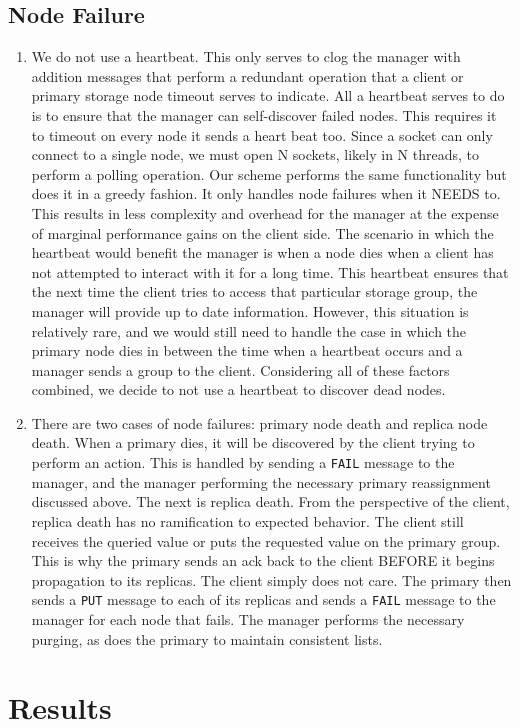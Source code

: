 \documentclass{article}
\begin{document}
\subsection{Node Failure}
\begin{enumerate}
    \item We do not use a heartbeat. This only serves to clog the manager with addition messages that perform a redundant operation that a client or primary storage node timeout
    serves to indicate. All a heartbeat serves to do is to ensure that the manager can self-discover failed nodes. This requires it to timeout on every node it sends a heart beat too.
    Since a socket can only connect to a single node, we must open N sockets, likely in N threads, to perform a polling operation. Our scheme performs the same functionality but does it
    in a greedy fashion. It only handles node failures when it NEEDS to. This results in less complexity and overhead for the manager at the expense of marginal performance gains on the 
    client side. The scenario in which the heartbeat would benefit the manager is when a node dies when a client has not attempted to interact with it for a long time. This heartbeat 
    ensures that the next time the client tries to access that particular storage group, the manager will provide up to date information. However, this situation is relatively rare, and 
    we would still need to handle the case in which the primary node dies in between the time when a heartbeat occurs and a manager sends a group to the client. Considering all of these factors
    combined, we decide to not use a heartbeat to discover dead nodes. 
    \item There are two cases of node failures: primary node death and replica node death. When a primary dies, it will be discovered by the client trying to perform an action. This is 
    handled by sending a \texttt{FAIL} message to the manager, and the manager performing the necessary primary reassignment discussed above. The next is replica death. From the perspective
    of the client, replica death has no ramification to expected behavior. The client still receives the queried value or puts the requested value on the primary group. This is why
    the primary sends an ack back to the client BEFORE it begins propagation to its replicas. The client simply does not care. The primary then sends a \texttt{PUT} message to each of 
    its replicas and sends a \texttt{FAIL} message to the manager for each node that fails. The manager performs the necessary purging, as does the primary to maintain consistent lists.
\end{enumerate}
\section{Results}
\end{document}
